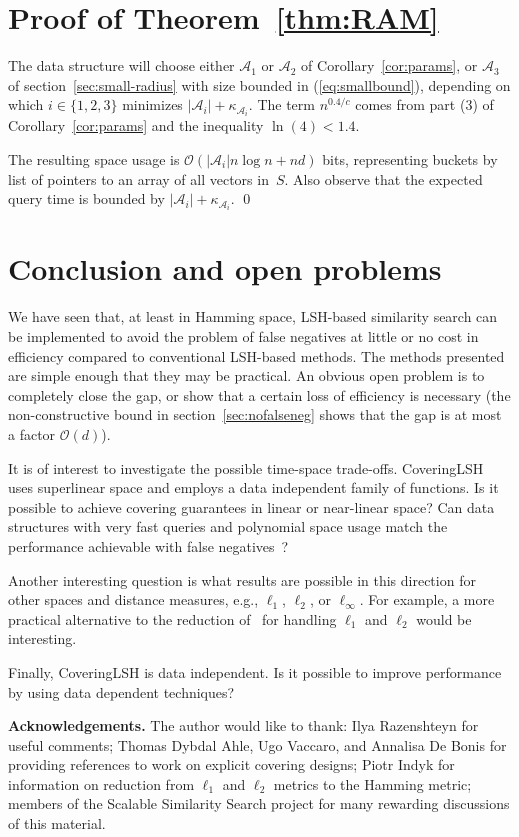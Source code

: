 \documentclass[prodmode,acmtalg]{acmsmall}
\newcommand{\Osymbol}{{\mathcal O}}
\newcommand{\BO}[1]{\Osymbol\left(#1\right)}
\begin{document}
\section{Proof of Theorem~\ref{thm:RAM}}

The data structure will choose either $\mathcal{A}_1$ or $\mathcal{A}_2$ of Corollary~\ref{cor:params}, or $\mathcal{A}_3$ of section~\ref{sec:small-radius} with size bounded in (\ref{eq:smallbound}), depending on which $i\in\{1,2,3\}$ minimizes $|\mathcal{A}_i| + \kappa_{\mathcal{A}_i}$. The term $n^{0.4/c}$ comes from part (3) of Corollary~\ref{cor:params} and the inequality $\ln(4) < 1.4$.

The resulting space usage is $\BO{|\mathcal{A}_i| n \log n + nd}$ bits, representing buckets by list of pointers to an array of all vectors in~$S$.
Also observe that the expected query time is bounded by $|\mathcal{A}_i| + \kappa_{\mathcal{A}_i}$.
\qed



\section{Conclusion and open problems}

We have seen that, at least in Hamming space, LSH-based similarity search can be implemented to avoid the problem of false negatives at little or no cost in efficiency compared to conventional LSH-based methods.
The methods presented are simple enough that they may be practical.
An obvious open problem is to completely close the gap, or show that a certain loss of efficiency is necessary (the non-constructive bound in section~\ref{sec:nofalseneg} shows that the gap is at most a factor $\BO{d}$).

It is of interest to investigate the possible time-space trade-offs.
CoveringLSH uses superlinear space and employs a data independent family of functions. 
Is it possible to achieve covering guarantees in linear or near-linear space?
Can data structures with very fast queries and polynomial space usage match the performance achievable with false negatives~\cite{DBLP:journals/corr/Laarhoven15a}?

Another interesting question is what results are possible in this direction for other spaces and distance measures, e.g., $\ell_1$, $\ell_2$, or $\ell_\infty$.
For example, a more practical alternative to the reduction of~\cite{DBLP:conf/stoc/Indyk07} for handling $\ell_1$ and $\ell_2$ would be interesting.

Finally, CoveringLSH is data independent. Is it possible to improve performance by using data dependent techniques?


\medskip

{\bf Acknowledgements.} The author would like to thank: Ilya Razenshteyn for useful comments; Thomas Dybdal Ahle, Ugo Vaccaro, and Annalisa De Bonis for providing references to work on explicit covering designs; Piotr Indyk for information on reduction from $\ell_1$ and $\ell_2$ metrics to the Hamming metric; members of the Scalable Similarity Search project for many rewarding discussions of this material.

\newpage



\end{document}
